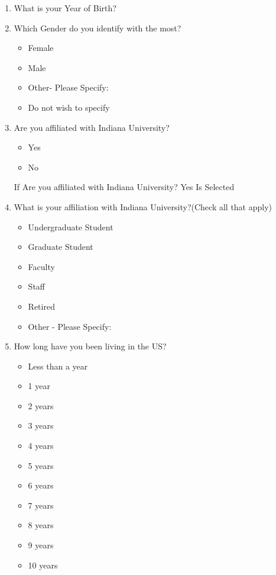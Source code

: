 \begin{enumerate}
\item What is your Year of Birth?\\
\begin{itemize}
\end{itemize}
\item Which Gender do you identify with the most?\\
\begin{itemize}
\item Female
\item Male
\item Other- Please Specify:
\item Do not wish to specify
\end{itemize}
\item Are you affiliated with Indiana University?\\
\begin{itemize}
\item Yes
\item No
\end{itemize}
If Are you affiliated with Indiana University? Yes Is Selected\\
\item What is your affiliation with Indiana University?(Check all that apply)\\
\begin{itemize}
\item Undergraduate Student
\item Graduate Student
\item Faculty
\item Staff
\item Retired
\item Other - Please Specify:
\end{itemize}
\item How long have you been living in the US?\\
\begin{itemize}
\item Less than a year
\item 1 year
\item 2 years
\item 3 years
\item 4 years
\item 5 years
\item 6 years
\item 7 years
\item 8 years
\item 9 years
\item 10 years

\end{itemize}
\end{enumerate}
